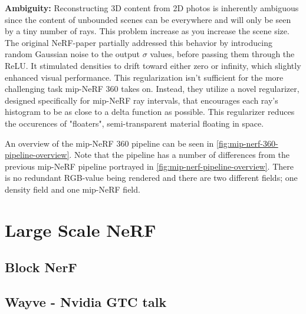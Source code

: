 \textbf{Ambiguity:}
Reconstructing 3D content from 2D photos is inherently ambiguous since the content of unbounded scenes can be everywhere and will only be seen by a tiny number of rays. This problem increase as you increase the scene size. The original NeRF-paper partially addressed this behavior by introducing random Gaussian noise to the output $\sigma$ values, before passing them through the ReLU. It stimulated densities to drift toward either zero or infinity, which slightly enhanced visual performance. This regularization isn't sufficient for the more challenging task mip-NeRF 360 takes on. Instead, they utilize a novel regularizer, designed specifically for mip-NeRF ray intervals, that encourages each ray's histogram to be as close to a delta function as possible. This regularizer reduces the occurences of "floaters", semi-transparent material floating in space.



An overview of the mip-NeRF 360 pipeline can be seen in \autoref{fig:mip-nerf-360-pipeline-overview}. Note that the pipeline has a number of differences from the previous mip-NeRF pipeline portrayed in \autoref{fig:mip-nerf-pipeline-overview}. There is no redundant RGB-value being rendered and there are two different fields; one density field and one mip-NeRF field.


\section{Large Scale NeRF} \label{sec:large-scale-nerf}

\subsection{Block NerF}
\subsection{Wayve - Nvidia GTC talk}

